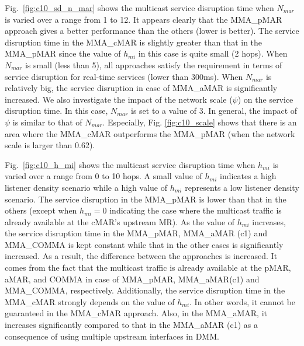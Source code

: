 Fig.~\ref{fig:c10_sd_n_mar} shows the multicast service disruption time when $N_{mar}$ is varied over a range from 1 to 12. It appears clearly that the MMA\_pMAR approach gives a better performance than the others (lower is better). The service disruption time in the MMA\_cMAR is slightly greater than that in the MMA\_pMAR since the value of $h_{mi}$ in this case is quite small (2 hops). When $N_{mar}$ is small (less than 5), all approaches satisfy the requirement in terms of service disruption for real-time services (lower than 300ms). When $N_{mar}$ is relatively big, the service disruption in case of MMA\_aMAR is significantly increased. We also investigate the impact of the network scale ($\psi$) on the service disruption time. In this case, $N_{mar}$ is set to a value of 3. In general, the impact of $\psi$ is similar to that of $N_{mar}$. Especially, Fig. \ref{fig:c10_scale} shows that there is an area where the MMA\_cMAR outperforms the MMA\_pMAR (when the network scale is larger than 0.62).

Fig.~\ref{fig:c10_h_mi} shows the multicast service disruption time when $h_{mi}$ is varied over a range from 0 to 10 hops. A small value of $h_{mi}$ indicates a high listener density scenario while a high value of $h_{mi}$ represents a low listener density scenario. The service disruption in the MMA\_pMAR is lower than that in the others (except when $h_{mi}=0$ indicating the case where the multicast traffic is already available at the cMAR's upstream MR). As the value of $h_{mi}$ increases, the service disruption time in the MMA\_pMAR, MMA\_aMAR (c1) and MMA\_COMMA is kept constant while that in the other cases is significantly increased. As a result, the difference between the approaches is increased. It comes from the fact that the multicast traffic is already available at the pMAR, aMAR, and COMMA in case of MMA\_pMAR, MMA\_aMAR(c1) and MMA\_COMMA, respectively. Additionally, the service disruption time in the MMA\_cMAR strongly depends on the value of $h_{mi}$. In other words, it cannot be guaranteed in the MMA\_cMAR approach. Also, in the MMA\_aMAR, it increases significantly compared to that in the MMA\_aMAR (c1) as a consequence of using multiple upstream interfaces in DMM. 


